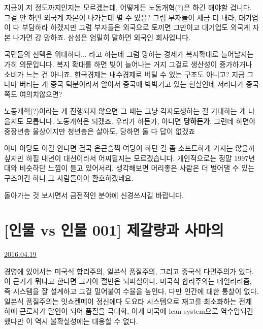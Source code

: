 지금이 저 정도까지인지는 모르겠는데, 어떻게든 노동개혁(?)은 하긴 해야할 겁니다. 그걸 안 하면 외국계 자본이 나가는데 별 수 있음?
그럼 부자들이 세금 더 내라, 대기업이 다 부담하라 하겠지만 그럼 부자들은 외국으로 토끼면 그만이고 대기업도 외국계 자본 나가면 걍 망하죠.
삼성은 엄밀히 말하면 외국인 회사입니다.
\vspace{5mm}

국민들의 선택은 위대하다... 라고 하는데 그럼 망하는 경제가 복지확대로 늘어날지는 가히 의문입니다.
복지 확대를 하면 빚이 늘어나는 거지 그걸로 생산성이 증가하거나 소비가 느는 건 아니죠. 한국경제는 내수경제로 버틸 수 있는 구조도 아니고?
지금 그나마 버티는 게 중국 덕분이라서 알아서 중국에 박박기고 있는 현실인데 저러다가 중국 쪽도 여의치않으면?
\vspace{5mm}

노동개혁(?)이라는 게 진행되지 않으면 그 때는 그냥 각자도생하는 걸 기대하는 게 나을지도 모릅니다.
노동개혁은 되겠죠. 우리가 하든가, 아니면 \textbf{당하든가}.
그런데 하면야 중장년층 울상이지만 청년층은 살아도, 당하면 둘 다 답이 없겠죠
\vspace{5mm}

아마 야당도 이걸 안다면 결국 은근슬쩍 여당이 하던 걸 좀 소프트하게 가지는 않을까 싶지만
하필 내년이 대선이라서 어찌될지는 모르겠습니다. 개인적으로는 정말 1997년대와 비슷하단 느낌이 들고 있어서리.
생각해보면 머리좋은 사람은 더 벌어댈 수 있는 구조이긴 하니 그 사람들이야 환호하겠네요.
\vspace{5mm}

돌아가는 것 보시면서 금전적인 분야에 신경쓰시길 바랍니다.





\section{[인물 vs 인물 001] 제갈량과 사마의}
\href{https://www.kockoc.com/Apoc/736095}{2016.04.19}

\vspace{5mm}

경영에 있어서는 미국식 합리주의, 일본식 품질주의, 그리고 중국식 다면주의가 있다.
이 근거가 뭐냐고 한다면 그거야 절반은 뇌피셜이다.
미국식 합리주의는 테일러리즘, 즉 시스템을 잘 설계하고 그걸 밀어붙여 수율을 높인다, 다만 인간에 대한 통찰이 없다.
일본식 품질주의는 잇쇼켄메이 정신에다 도요타 시스템으로 재고를 최소화하는 전제 하에 근로자가 달인이 되어 품질을 극대화,
이게 미국에 lean system으로 역수입되긴 했다만 이 역시 불확실성에는 대응할 수 없다.
\vspace{5mm}

